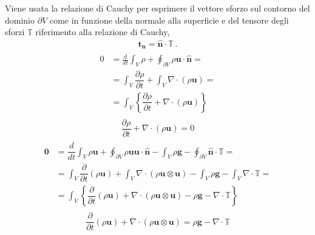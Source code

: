 \documentclass[letterpaper,10pt,english]{jupyterBook}
\begin{document}
\sphinxAtStartPar
Viene usata la relazione di Cauchy per esprimere il vettore sforzo sul contorno del dominio \(\partial V\) come in funzione della normale alla superficie e del tensore degli sforzi \(\mathbb{T}\)  riferimento alla relazione di Cauchy,
\begin{equation*}
\begin{split}\mathbf{t_n} = \mathbf{\hat{n}} \cdot \mathbb{T} \ .\end{split}
\end{equation*}
\sphinxAtStartPar
{}
\begin{equation*}
\begin{split}\begin{aligned}
 0 & = \frac{d}{dt} \int_{V} \rho + \oint_{\partial V} \rho \mathbf{u} \cdot \mathbf{\hat{n}} = \\
   & = \int_{V} \dfrac{\partial \rho }{\partial t} + \int_{V} \nabla \cdot \left( \rho \mathbf{u} \right) = \\
   & = \int_{V} \left\{ \dfrac{\partial \rho }{\partial t} + \nabla \cdot \left( \rho \mathbf{u} \right) \right\} 
\end{aligned}\end{split}
\end{equation*}\begin{equation*}
\begin{split}\dfrac{\partial \rho }{\partial t} + \nabla \cdot \left( \rho \mathbf{u} \right) = 0\end{split}
\end{equation*}
\sphinxAtStartPar
{}
\begin{equation*}
\begin{split}\begin{aligned}
 \mathbf{0} & = \dfrac{d}{dt} \int_{V} \rho \mathbf{u} + \oint_{\partial V} \rho \mathbf{u} \mathbf{u} \cdot \mathbf{\hat{n}} - \int_{V} \rho \mathbf{g} - \oint_{\partial V} \mathbf{\hat{n}} \cdot \mathbb{T} = \\
            & = \int_{V} \dfrac{\partial }{\partial t} \left( \rho \mathbf{u} \right) + \int_{V} \nabla \cdot \left( \rho \mathbf{u} \otimes \mathbf{u} \right) - \int_{V} \rho \mathbf{g} - \int_{V} \nabla \cdot \mathbb{T} = \\
            & = \int_{V} \left\{ \dfrac{\partial }{\partial t} \left( \rho \mathbf{u} \right) +  \nabla \cdot \left( \rho \mathbf{u} \otimes \mathbf{u} \right) - \rho \mathbf{g} - \nabla \cdot \mathbb{T} \right\} 
\end{aligned}\end{split}
\end{equation*}\begin{equation*}
\begin{split} \dfrac{\partial }{\partial t} \left( \rho \mathbf{u} \right) +  \nabla \cdot \left( \rho \mathbf{u} \otimes \mathbf{u} \right) = \rho \mathbf{g} - \nabla \cdot \mathbb{T} \end{split}
\end{equation*}
\sphinxAtStartPar
{}
\end{document}
